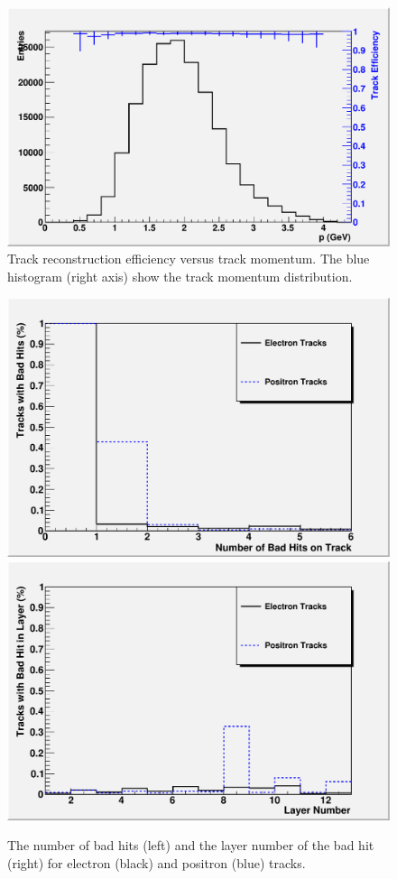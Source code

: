 \begin{figure}
\includegraphics[scale=0.8]{TrackingPerformance/pzE-Effic.pdf}
\caption{ Track reconstruction efficiency versus track momentum.  The blue histogram (right axis) show the track momentum distribution.  }
\label{fig:trkeffic}
\end{figure}

\begin{figure}
\includegraphics[scale=0.4]{TrackingPerformance/nBadHits.pdf}
\includegraphics[scale=0.4]{TrackingPerformance/BadLayer.pdf}
\caption{ The number of bad hits (left) and the layer number of the bad hit (right) 
for electron (black) and positron (blue) tracks.   }
\label{fig:badhits}
\end{figure}



